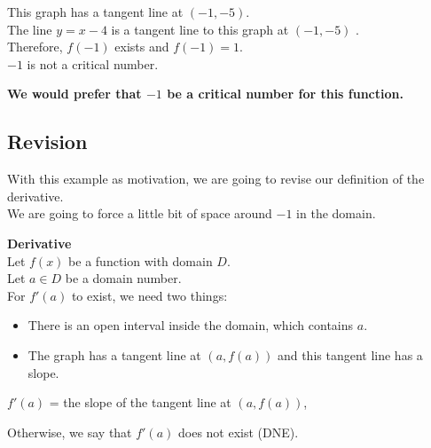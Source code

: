 \documentclass{ximera}
\begin{document}
This graph has a tangent line at $(-1,-5)$.  \\

The line $y = x - 4$ is a tangent line to this graph at $(-1,-5)$ . \\

Therefore, $f(-1)$ exists and $f(-1) = 1$.  \\

$-1$ is not a critical number. \\


\begin{center}
\textbf{\textcolor{red!80!black}{We would prefer that $-1$ be a critical number for this function.}}
\end{center}














\subsection{Revision}


With this example as motivation, we are going to revise our definition of the derivative. \\


We are going to force a little bit of space around $-1$ in the domain. \\




\begin{definition} \textbf{\textcolor{green!50!black}{Derivative}}  \\

Let $f(x)$ be a function with domain $D$. \\
Let $a \in D$ be a domain number. \\



For $f'(a)$ to exist, we need two things:

\begin{itemize}
\item There is an open interval inside the domain, which contains $a$.
\item The graph has a tangent line at $(a, f(a))$ and this tangent line has a slope.
\end{itemize}



\begin{center}

$f'(a)$ = the slope of the tangent line at $(a, f(a))$,

\end{center}



Otherwise, we say that $f'(a)$ does not exist (DNE).






\end{definition}
\end{document}
